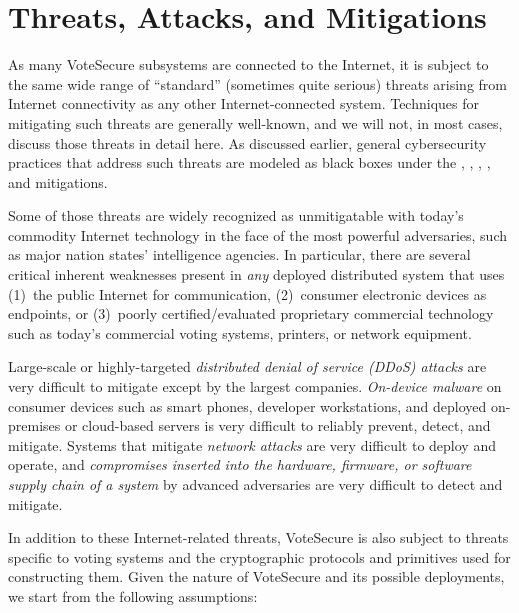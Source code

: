 \documentclass[10pt,letterpaper]{article}
\begin{document}
\pagebreak
\section{Threats, Attacks, and Mitigations}

As many VoteSecure subsystems are connected to the Internet, it is subject to the same wide range of ``standard'' (sometimes quite serious) threats arising from Internet connectivity as any other Internet-connected system. Techniques for mitigating such threats are generally well-known, and we will not, in most cases, discuss those threats in detail here. As discussed earlier, general cybersecurity practices that address such threats are modeled as black boxes under the \RefFullMCybersecurityEscalation{}, \RefFullMCybersecurityIntrusion{}, \RefFullMCybersecurityMalware{}, \RefFullMCybersecuritySupplyChains{}, and \RefFullMCybersecurityVirtualization{} mitigations.

Some of those threats are widely recognized as unmitigatable with today's commodity Internet technology in the face of the most powerful adversaries, such as major nation states' intelligence agencies. In particular, there are several critical inherent weaknesses present in \emph{any} deployed distributed system that uses (1)~the public Internet for communication, (2)~consumer electronic devices as endpoints, or (3)~poorly certified/evaluated proprietary commercial technology such as today's commercial voting systems, printers, or network equipment.

Large-scale or highly-targeted \emph{distributed denial of service (DDoS) attacks} are very difficult to mitigate except by the largest companies. \emph{On-device malware} on consumer devices such as smart phones, developer workstations, and deployed on-premises or cloud-based servers is very difficult to reliably prevent, detect, and mitigate. Systems that mitigate \emph{network attacks} are very difficult to deploy and operate, and \emph{compromises inserted into the hardware, firmware, or software supply chain of a system} by advanced adversaries are very difficult to detect and mitigate.

In addition to these Internet-related threats, VoteSecure is also subject to threats specific to voting systems and the cryptographic protocols and primitives used for constructing them. Given the nature of VoteSecure and its possible deployments, we start from the following assumptions:
\end{document}
